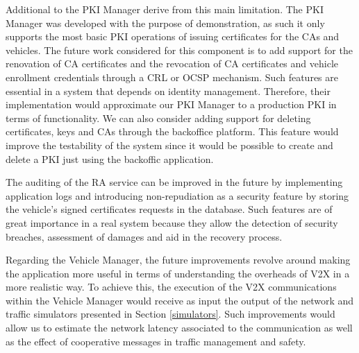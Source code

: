 Additional to the PKI Manager derive from this main limitation. The PKI Manager was developed with the purpose of demonstration, as such it only supports the most basic PKI operations of issuing certificates for the CAs and vehicles. The future work considered for this component is to add support for the renovation of CA certificates and the revocation of CA certificates and vehicle enrollment credentials through a CRL or OCSP mechanism. Such features are essential in a system that depends on identity management. Therefore, their implementation would approximate our PKI Manager to a production PKI in terms of functionality. We can also consider adding support for deleting certificates, keys and CAs through the backoffice platform. This feature would improve the testability of the system since it would be possible to create and delete a PKI just using the backoffic application.

The auditing of the RA service can be improved in the future by implementing application logs and introducing non-repudiation as a security feature by storing the vehicle's signed certificates requests in the database. Such features are of great importance in a real system because they allow the detection of security breaches, assessment of damages and aid in the recovery process. 

Regarding the Vehicle Manager, the future improvements revolve around making the application more useful in terms of understanding the overheads of V2X in a more realistic way. To achieve this, the execution of the V2X communications within the Vehicle Manager would receive as input the output of the network and traffic simulators presented in Section \ref{simulators}. Such improvements would allow us to estimate the network latency associated to the communication as well as the effect of cooperative messages in traffic management and safety. 


